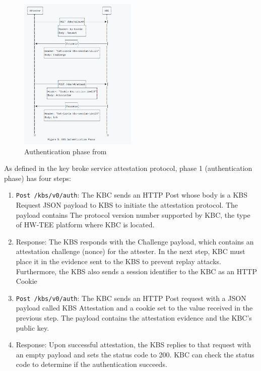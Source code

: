 \begin{figure}[!htb]
    \centering
    \includegraphics[width=0.5\textwidth]{images/attestation.PNG}
    \caption[Authentication phase]{Authentication phase from~\cite*{kbs_Attestation_protocol}}
    \label{fig:Authentication}
\end{figure}

As defined in the key broke service attestation protocol, phase 1 (authentication phase) has four steps: 
\begin{displayquote}
    \begin{enumerate}
        \item  \texttt{Post /kbs/v0/auth}: The KBC sends an HTTP Post whose body is a KBS Request JSON payload to KBS to initiate the attestation protocol. The payload contains The protocol version number supported by KBC, the type of HW-TEE platform where KBC is located.
        \item  Response: The KBS responds with the Challenge payload, which contains an attestation challenge (nonce) for the attester. In the next step, KBC must place it in the evidence sent to the KBS to prevent replay attacks. Furthermore, the KBS also sends a session identifier to the KBC as an HTTP Cookie
        \item  \texttt{Post /kbs/v0/auth}: The KBC sends an HTTP Post request with a JSON payload called KBS Attestation and a cookie set to the value received in the previous step. The payload contains the attestation evidence and the KBC’s public key.
        \item  Response: Upon successful attestation, the KBS replies to that request with an empty payload and sets the status code to 200. KBC can check the status code to determine if the authentication succeeds. 
    \end{enumerate}
\end{displayquote}

